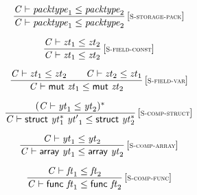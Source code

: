 $$
\begin{array}{@{}c@{}}\displaystyle
\frac{
{\mathit{C}} \vdash {\mathit{packtype}}_{{1}} \leq {\mathit{packtype}}_{{2}}
}{
{\mathit{C}} \vdash {\mathit{packtype}}_{{1}} \leq {\mathit{packtype}}_{{2}}
} \, {[\textsc{\scriptsize S{-}storage{-}pack}]}
\qquad
\end{array}
$$

\vspace{1ex}

$$
\begin{array}{@{}c@{}}\displaystyle
\frac{
{\mathit{C}} \vdash {\mathit{zt}}_{{1}} \leq {\mathit{zt}}_{{2}}
}{
{\mathit{C}} \vdash {\mathit{zt}}_{{1}} \leq {\mathit{zt}}_{{2}}
} \, {[\textsc{\scriptsize S{-}field{-}const}]}
\qquad
\end{array}
$$

$$
\begin{array}{@{}c@{}}\displaystyle
\frac{
{\mathit{C}} \vdash {\mathit{zt}}_{{1}} \leq {\mathit{zt}}_{{2}}
 \qquad
{\mathit{C}} \vdash {\mathit{zt}}_{{2}} \leq {\mathit{zt}}_{{1}}
}{
{\mathit{C}} \vdash \mathsf{mut}~{\mathit{zt}}_{{1}} \leq \mathsf{mut}~{\mathit{zt}}_{{2}}
} \, {[\textsc{\scriptsize S{-}field{-}var}]}
\qquad
\end{array}
$$

\vspace{1ex}

$$
\begin{array}{@{}c@{}}\displaystyle
\frac{
({\mathit{C}} \vdash {\mathit{yt}}_{{1}} \leq {\mathit{yt}}_{{2}})^\ast
}{
{\mathit{C}} \vdash \mathsf{struct}~{{\mathit{yt}}_{{1}}^\ast}~{\mathit{yt}'}_{{1}} \leq \mathsf{struct}~{{\mathit{yt}}_{{2}}^\ast}
} \, {[\textsc{\scriptsize S{-}comp{-}struct}]}
\qquad
\end{array}
$$

$$
\begin{array}{@{}c@{}}\displaystyle
\frac{
{\mathit{C}} \vdash {\mathit{yt}}_{{1}} \leq {\mathit{yt}}_{{2}}
}{
{\mathit{C}} \vdash \mathsf{array}~{\mathit{yt}}_{{1}} \leq \mathsf{array}~{\mathit{yt}}_{{2}}
} \, {[\textsc{\scriptsize S{-}comp{-}array}]}
\qquad
\end{array}
$$

$$
\begin{array}{@{}c@{}}\displaystyle
\frac{
{\mathit{C}} \vdash {\mathit{ft}}_{{1}} \leq {\mathit{ft}}_{{2}}
}{
{\mathit{C}} \vdash \mathsf{func}~{\mathit{ft}}_{{1}} \leq \mathsf{func}~{\mathit{ft}}_{{2}}
} \, {[\textsc{\scriptsize S{-}comp{-}func}]}
\qquad
\end{array}
$$

